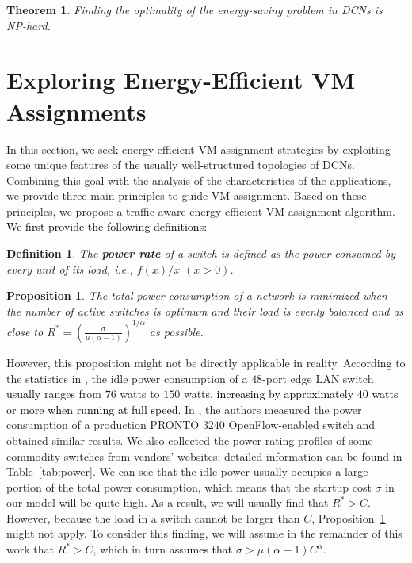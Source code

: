 \documentclass[journal,single-space,two column,twoside,10pt]{IEEEtran}
\newtheorem{theorem}{Theorem}
\newtheorem{proposition}{Proposition}
\newtheorem{definition}{Definition}
\begin{document}
\begin{theorem}
Finding the optimality of the energy-saving problem in DCNs is NP-hard.
\end{theorem}


\section{Exploring Energy-Efficient VM Assignments}
\label{sec:assign}

In this section, we seek energy-efficient VM assignment strategies by exploiting some unique features of the usually well-structured topologies of DCNs. Combining this goal with the analysis of the characteristics of the applications, we provide three main principles to guide VM assignment. Based on these principles, we propose a traffic-aware energy-efficient VM assignment algorithm. \textcolor{black}{We first provide the following definitions:}

\begin{definition}
The \textbf{power rate} of a switch is defined as the power consumed by every unit of its load, i.e., $f(x)/x$ $(x > 0)$.
\end{definition}

\begin{proposition}
\label{prop:opt_load}
The total power consumption of a network is minimized when the number of active switches is optimum and their load is evenly balanced and as close to $R^* =  \left(\frac{\sigma}{\mu(\alpha-1)}\right)^{1/\alpha}$ as possible.
\end{proposition}

However, this proposition might not be directly applicable in reality. According to the statistics in \cite{Mahadevan_Sharma-2009}, the idle power consumption of a $48$-port edge LAN switch \textcolor{black}{usually} ranges from $76$ watts to $150$ watts, \textcolor{black}{increasing by approximately $40$ watts or more when running at full speed}. In \cite{Wang_Yao-2012}, the authors measured the power consumption of a production PRONTO $3240$ OpenFlow-enabled switch and obtained similar results. We also collected the power rating profiles of some commodity switches from vendors' websites; detailed information can be found in Table~\ref{tab:power}. We can see that the idle power usually occupies a large portion of the total power consumption, which means that the startup cost $\sigma$ in our model will be quite high. As a result, we will usually find that $R^* > C$. However, because the load in a switch cannot be larger than $C$, Proposition~\ref{prop:opt_load} might not apply. To consider this finding, we will assume in the remainder of this work that $R^* > C$, which in turn \textcolor{black}{assumes that} $\sigma > \mu(\alpha - 1) C^{\alpha}$.
\end{document}

